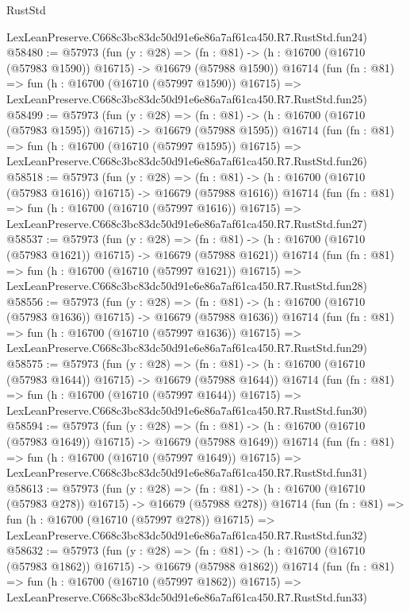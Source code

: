 \begin{lexlean}{RustStd}
\begin{coremodule}
    LexLeanPreserve.C668c3bc83dc50d91e6e86a7af61ca450.R7.RustStd.fun24)
@58480 := @57973
    (fun (y : @28) =>
    (fn : @81) -> (h : @16700 (@16710 (@57983 @1590)) @16715) -> @16679 (@57988 @1590))
    @16714
    (fun (fn : @81) =>
    fun (h : @16700 (@16710 (@57997 @1590)) @16715) =>
    LexLeanPreserve.C668c3bc83dc50d91e6e86a7af61ca450.R7.RustStd.fun25)
@58499 := @57973
    (fun (y : @28) =>
    (fn : @81) -> (h : @16700 (@16710 (@57983 @1595)) @16715) -> @16679 (@57988 @1595))
    @16714
    (fun (fn : @81) =>
    fun (h : @16700 (@16710 (@57997 @1595)) @16715) =>
    LexLeanPreserve.C668c3bc83dc50d91e6e86a7af61ca450.R7.RustStd.fun26)
@58518 := @57973
    (fun (y : @28) =>
    (fn : @81) -> (h : @16700 (@16710 (@57983 @1616)) @16715) -> @16679 (@57988 @1616))
    @16714
    (fun (fn : @81) =>
    fun (h : @16700 (@16710 (@57997 @1616)) @16715) =>
    LexLeanPreserve.C668c3bc83dc50d91e6e86a7af61ca450.R7.RustStd.fun27)
@58537 := @57973
    (fun (y : @28) =>
    (fn : @81) -> (h : @16700 (@16710 (@57983 @1621)) @16715) -> @16679 (@57988 @1621))
    @16714
    (fun (fn : @81) =>
    fun (h : @16700 (@16710 (@57997 @1621)) @16715) =>
    LexLeanPreserve.C668c3bc83dc50d91e6e86a7af61ca450.R7.RustStd.fun28)
@58556 := @57973
    (fun (y : @28) =>
    (fn : @81) -> (h : @16700 (@16710 (@57983 @1636)) @16715) -> @16679 (@57988 @1636))
    @16714
    (fun (fn : @81) =>
    fun (h : @16700 (@16710 (@57997 @1636)) @16715) =>
    LexLeanPreserve.C668c3bc83dc50d91e6e86a7af61ca450.R7.RustStd.fun29)
@58575 := @57973
    (fun (y : @28) =>
    (fn : @81) -> (h : @16700 (@16710 (@57983 @1644)) @16715) -> @16679 (@57988 @1644))
    @16714
    (fun (fn : @81) =>
    fun (h : @16700 (@16710 (@57997 @1644)) @16715) =>
    LexLeanPreserve.C668c3bc83dc50d91e6e86a7af61ca450.R7.RustStd.fun30)
@58594 := @57973
    (fun (y : @28) =>
    (fn : @81) -> (h : @16700 (@16710 (@57983 @1649)) @16715) -> @16679 (@57988 @1649))
    @16714
    (fun (fn : @81) =>
    fun (h : @16700 (@16710 (@57997 @1649)) @16715) =>
    LexLeanPreserve.C668c3bc83dc50d91e6e86a7af61ca450.R7.RustStd.fun31)
@58613 := @57973
    (fun (y : @28) =>
    (fn : @81) -> (h : @16700 (@16710 (@57983 @278)) @16715) -> @16679 (@57988 @278))
    @16714
    (fun (fn : @81) =>
    fun (h : @16700 (@16710 (@57997 @278)) @16715) =>
    LexLeanPreserve.C668c3bc83dc50d91e6e86a7af61ca450.R7.RustStd.fun32)
@58632 := @57973
    (fun (y : @28) =>
    (fn : @81) -> (h : @16700 (@16710 (@57983 @1862)) @16715) -> @16679 (@57988 @1862))
    @16714
    (fun (fn : @81) =>
    fun (h : @16700 (@16710 (@57997 @1862)) @16715) =>
    LexLeanPreserve.C668c3bc83dc50d91e6e86a7af61ca450.R7.RustStd.fun33)

\end{coremodule}
\end{lexlean}
